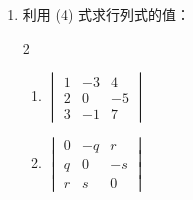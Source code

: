 \begin{enumerate}[label=\arabic*., leftmargin=2em]
  \item 利用 (4) 式求行列式的值：
  \begin{multicols}{2}
  \begin{enumerate}[label=(\roman*)]
    \item $\begin{vmatrix} 1 & -3 & 4 \\ 2 & 0 & -5 \\ 3 & -1 & 7 \end{vmatrix}$
    \item $\begin{vmatrix} 0 & -q & r \\ q & 0 & -s \\ r & s & 0 \end{vmatrix}$
  \end{enumerate}
  \end{multicols}


\end{enumerate}
